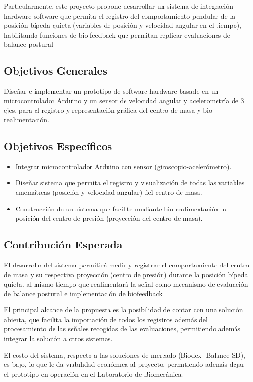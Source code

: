 \documentclass[12pt,a4paper]{article}
\begin{document}
Particularmente, este proyecto propone desarrollar un sistema de integración hardware-software que permita el registro del comportamiento pendular de la posición bípeda quieta (variables de posición y velocidad angular en el tiempo), habilitando funciones de bio-feedback que permitan replicar evaluaciones de balance postural.

\subsection{Objetivos Generales}
Diseñar e implementar un prototipo de software-hardware basado en un microcontrolador Arduino y un sensor de velocidad angular y acelerometría de 3 ejes, para el registro y representación gráfica del centro de masa y bio-realimentación.

\subsection{Objetivos Específicos}
\begin{itemize}
	\item Integrar microcontrolador Arduino con sensor (giroscopio-acelerómetro).
	\item Diseñar sistema que permita el registro y visualización de todas las variables cinemáticas (posición y velocidad angular) del centro de masa. 
	\item Construcción de un sistema que facilite mediante bio-realimentación la posición del centro de presión (proyección del centro de masa).
\end{itemize}	

\subsection{Contribución Esperada}

El desarrollo del sistema permitirá medir y registrar el comportamiento del centro de masa y su respectiva proyección (centro de presión) durante la posición bípeda quieta, al mismo tiempo que realimentará la señal como mecanismo de evaluación de balance postural e implementación de biofeedback.

El principal alcance de la propuesta es la posibilidad de contar con una solución abierta, que facilita la importación de todos los registros además del procesamiento de las señales recogidas de las evaluaciones, permitiendo además integrar la solución a otros sistemas.

El costo del sistema, respecto a las soluciones de mercado (Biodex- Balance SD), es bajo, lo que le da viabilidad económica al proyecto, permitiendo además dejar el prototipo en operación en el Laboratorio de Biomecánica. 
\end{document}
